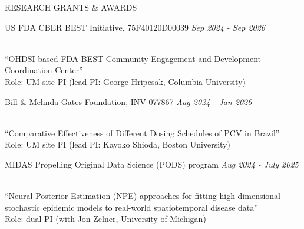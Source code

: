 \documentclass{resume} %
\newcommand{\thisYear}[1]{
	#1
}
\begin{document}
\begin{rSection}{RESEARCH GRANTS \& AWARDS}
	

	\hspace*{-0.25in} 
	\thisYear{
	US FDA CBER BEST Initiative,  75F40120D00039    \hfill{\em Sep 2024 - Sep 2026}
} \\
	``OHDSI-based FDA BEST Community Engagement and Development Coordination Center'' \\
	Role: UM site PI (lead PI: George Hripcsak, Columbia University)
	\medskip 
	
	\hspace*{-0.25in} 
		\thisYear{Bill \& Melinda Gates Foundation, INV-077867     \hfill{\em Aug 2024 - Jan 2026}
		}
			 \\
	``Comparative Effectiveness of Different Dosing Schedules of PCV in Brazil'' \\
	Role: UM site PI (lead PI: Kayoko Shioda, Boston University)
	
		\medskip 
	
	\hspace*{-0.25in} 
	\thisYear{
	MIDAS Propelling Original Data Science (PODS) program \hfill{\em Aug 2024 - July 2025} }
	\\
	``Neural Posterior Estimation (NPE) approaches for fitting high-dimensional stochastic epidemic models to real-world spatiotemporal disease data'' \\
	Role: dual PI (with Jon Zelner, University of Michigan)
	
\end{rSection}


\end{document}
